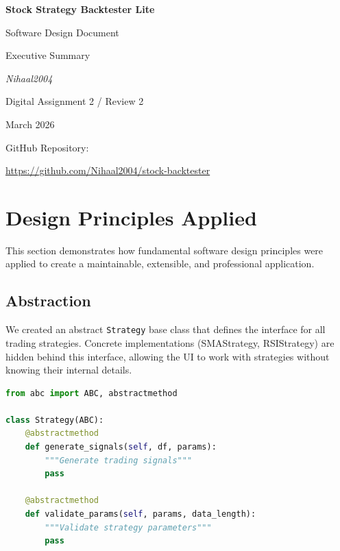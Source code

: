 \documentclass[11pt,a4paper]{article}
\begin{document}
\begin{titlepage}
    \centering
    \vspace*{2cm}
    
    {\Huge\bfseries Stock Strategy Backtester Lite\par}
    \vspace{1cm}
    {\Large Software Design Document\par}
    {\Large Executive Summary\par}
    \vspace{2cm}
    
    {\Large\itshape Nihaal2004\par}
    \vspace{1cm}
    
    {\large Digital Assignment 2 / Review 2\par}
    \vspace{0.5cm}
    {\large March 2026\par}
    \vfill
    
    {\large GitHub Repository:\par}
    {\small\url{https://github.com/Nihaal2004/stock-backtester}\par}
    
    \vspace{1cm}
\end{titlepage}

\tableofcontents
\newpage

\section{Design Principles Applied}

This section demonstrates how fundamental software design principles were applied to create a maintainable, extensible, and professional application.

\subsection{Abstraction}

We created an abstract \texttt{Strategy} base class that defines the interface for all trading strategies. Concrete implementations (SMAStrategy, RSIStrategy) are hidden behind this interface, allowing the UI to work with strategies without knowing their internal details.

\begin{lstlisting}[language=Python, caption=Strategy Abstraction Example]
from abc import ABC, abstractmethod

class Strategy(ABC):
    @abstractmethod
    def generate_signals(self, df, params):
        """Generate trading signals"""
        pass
    
    @abstractmethod
    def validate_params(self, params, data_length):
        """Validate strategy parameters"""
        pass
\end{lstlisting}
\end{document}
